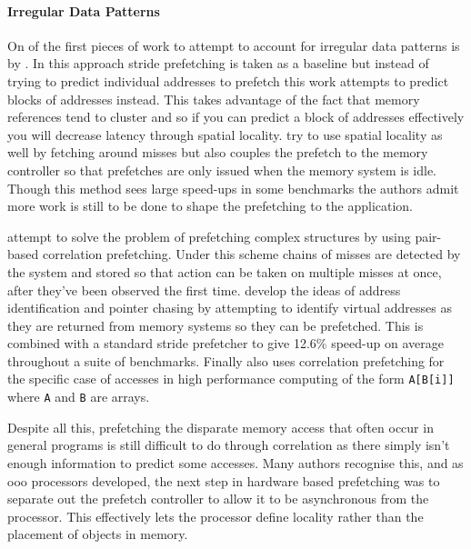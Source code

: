 \paragraph{Irregular Data Patterns}

On of the first pieces of work to attempt to account for irregular data patterns is by \citet{alexanderDistributedPrefetchbufferCache1996}. In this approach stride prefetching is taken as a baseline but instead of trying to predict individual addresses to prefetch this work attempts to predict blocks of addresses instead. This takes advantage of the fact that memory references tend to cluster and so if you can predict a block of addresses effectively you will decrease latency through spatial locality. \citet{linReducingDRAMLatencies2001} try to use spatial locality as well by fetching around misses but also couples the prefetch to the memory controller so that prefetches are only issued when the memory system is idle. Though this method sees large speed-ups in some benchmarks the authors admit more work is still to be done to shape the prefetching to the application.

\citet{solihinUsingUserlevelMemory2002} attempt to solve the problem of prefetching complex structures by using pair-based correlation prefetching. Under this scheme chains of misses are detected by the system and stored so that action can be taken on multiple misses at once, after they've been observed the first time. \citet{cookseyStatelessContentdirectedData2002a} develop the ideas of address identification and pointer chasing by attempting to identify virtual addresses as they are returned from memory systems so they can be prefetched. This is combined with a standard stride prefetcher to give 12.6\% speed-up on average throughout a suite of benchmarks. Finally \citet{yuIMPIndirectMemory2015} also uses correlation prefetching for the specific case of accesses in high performance computing of the form \texttt{A[B[i]]} where \texttt{A} and \texttt{B} are arrays.

Despite all this, prefetching the disparate memory access that often occur in general programs is still difficult to do through correlation as there simply isn't enough information to predict some accesses. Many authors recognise this, and as \gls{ooo} processors developed, the next step in hardware based prefetching was to separate out the prefetch controller to allow it to be asynchronous from the processor. This  effectively lets the processor define locality rather than the placement of objects in memory.

